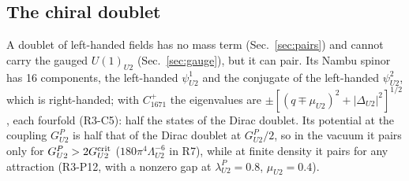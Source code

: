 \subsection{The chiral doublet}
\label{sec:chiral}

A doublet of left-handed fields has no mass term (Sec.~\ref{sec:pairs}) and cannot carry the gauged
$U(1)_{U2}$ (Sec.~\ref{sec:gauge}), but it can pair. Its Nambu spinor has 16 components, the
left-handed $\psi^1_{U2}$ and the conjugate of the left-handed $\psi^2_{U2}$, which is right-handed;
with $C^+_{1671}$ the eigenvalues are $\pm[(q\mp\mu_{U2})^2+|\Delta_{U2}|^2]^{1/2}$, each fourfold
(R3-C5): half the states of the Dirac doublet. Its potential at the coupling $G^P_{U2}$ is half
that of the Dirac doublet at $G^P_{U2}/2$, so in the vacuum it pairs only for
$G^P_{U2}>2G^{\rm crit}_{U2}$ ($180\pi^4\Lambda_{U2}^{-6}$ in R7), while at finite density it pairs for
any attraction (R3-P12, with a nonzero gap at $\lambda^P_{U2}=0.8$, $\mu_{U2}=0.4$).
